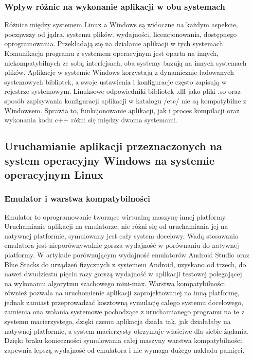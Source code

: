 \subsubsection{Wpływ różnic na wykonanie aplikacji w obu systemach}
Różnice między systemem Linux a Windows są widoczne na każdym aspekcie, począwszy od jądra, systemu plików, wydajności, licencjonowania, dostępnego oprogramowania. Przekładają się na działanie aplikacji w tych systemach. Komunikacja programu z systemem operacyjnym jest oparta na innych, niekompatybilnych ze sobą interfejsach, oba systemy bazują na innych systemach plików. Aplikacje w systemie Windows korzystają z dynamicznie ładowanych systemowych bibliotek, a swoje ustawienia i konfiguracje często zapisują w rejestrze systemowym. Linuksowe odpowiedniki bibliotek .dll jako pliki .so oraz sposób zapisywania konfiguracji aplikacji w katalogu /etc/ nie są kompatybilne z Windowsem. Sprawia to, funkcjonowanie aplikacji, jak i proces kompilacji oraz wykonania kodu c++ różni się między dwoma systemami.

\subsection{Uruchamianie aplikacji przeznaczonych na system operacyjny Windows na systemie operacyjnym Linux}
\subsubsection{Emulator i warstwa kompatybilności}
Emulator to oprogramowanie tworzące wirtualną maszynę innej platformy. Uruchamianie aplikacji na emulatorze, nie różni się od uruchamiania jej na natywnej platformie, symulowany jest cały system docelowy. Wadą stosowania emulatora jest nieporównywalnie gorsza wydajność w porównaniu do natywnej platformy. W artykule\cite{emulatorPerformance} porównującym wydajność emulatorów Android Studio oraz Blue Stacks do urządzeń fizycznych z systemem Android, uzyskano od trzech, do nawet dwudziestu pięciu razy gorszą wydajność w aplikacji testowej polegającej na wykonaniu algorytmu szachowego mini-max. Warstwa kompatybilności również pozwala na uruchomienie aplikacji zaprojektowanej na inną platformę, jednak zamiast przeprowadzać kosztowną symulację całego systemu docelowego, zamienia ona wołania systemowe pochodzące z uruchamianego programu na te z systemu macierzystego, dzięki czemu aplikacja działa tak, jak działałaby na natywnej platformie, a system macierzysty otrzymuje właściwe dla siebie żądania. Dzięki braku konieczności symulowania całej maszyny warstwa kompatybilności zapewnia lepszą wydajność od emulatora i nie wymaga dużego nakładu pamięci.

